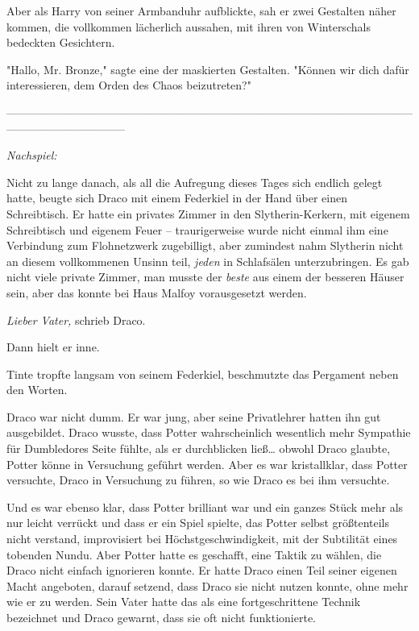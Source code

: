 {Aber als Harry von seiner Armbanduhr aufblickte, sah er zwei Gestalten näher kommen, die vollkommen lächerlich aussahen, mit ihren von Winterschals bedeckten Gesichtern.

"Hallo, Mr. Bronze," sagte eine der maskierten Gestalten. "Können wir dich dafür interessieren, dem Orden des Chaos beizutreten?"

--------------------------------------------------------------------------------------------------------------------------------------------

\emph{Nachspiel:}

Nicht zu lange danach, als all die Aufregung dieses Tages sich endlich gelegt hatte, beugte sich Draco mit einem Federkiel in der Hand über einen Schreibtisch. Er hatte ein privates Zimmer in den Slytherin-Kerkern, mit eigenem Schreibtisch und eigenem Feuer -- traurigerweise wurde nicht einmal ihm eine Verbindung zum Flohnetzwerk zugebilligt, aber zumindest nahm Slytherin nicht an diesem vollkommenen Unsinn teil, \emph{jeden} in Schlafsälen unterzubringen. Es gab nicht viele private Zimmer, man musste der \emph{beste} aus einem der besseren Häuser sein, aber das konnte bei Haus Malfoy vorausgesetzt werden.

\emph{Lieber Vater,} schrieb Draco.

Dann hielt er inne.

Tinte tropfte langsam von seinem Federkiel, beschmutzte das Pergament neben den Worten.

Draco war nicht dumm. Er war jung, aber seine Privatlehrer hatten ihn gut ausgebildet. Draco wusste, dass Potter wahrscheinlich wesentlich mehr Sympathie für Dumbledores Seite fühlte, als er durchblicken ließ… obwohl Draco glaubte, Potter könne in Versuchung geführt werden. Aber es war kristallklar, dass Potter versuchte, Draco in Versuchung zu führen, so wie Draco es bei ihm versuchte.

Und es war ebenso klar, dass Potter brilliant war und ein ganzes Stück mehr als nur leicht verrückt und dass er ein Spiel spielte, das Potter selbst größtenteils nicht verstand, improvisiert bei Höchstgeschwindigkeit, mit der Subtilität eines tobenden Nundu. Aber Potter hatte es geschafft, eine Taktik zu wählen, die Draco nicht einfach ignorieren konnte. Er hatte Draco einen Teil seiner eigenen Macht angeboten, darauf setzend, dass Draco sie nicht nutzen konnte, ohne mehr wie er zu werden. Sein Vater hatte das als eine fortgeschrittene Technik bezeichnet und Draco gewarnt, dass sie oft nicht funktionierte.

}
